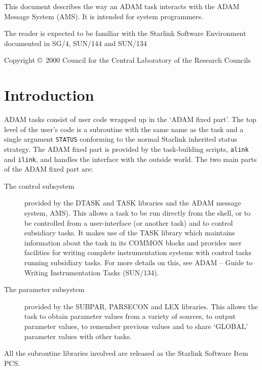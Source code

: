 \documentclass[twoside,11pt]{article}
\newcommand{\stardocinitials}  {SSN}
\newcommand{\stardoccopyright}
{Copyright \copyright\ 2000 Council for the Central Laboratory of the Research Councils}
\newcommand{\stardocnumber}    {77.0}
\newcommand{\stardocabstract}  {This document describes the way an ADAM task
interacts with the ADAM Message System
(\xref{AMS}{sun241}{}).
It is intended for system programmers.

The reader is expected to be familiar with the Starlink Software Environment
documented in
\xref{SG/4}{sg4}{},
\xref{SUN/144}{sun144}{}
and
\xref{SUN/134}{sun134}{}}
\newcommand{\stardocname}{\stardocinitials /\stardocnumber}
\newenvironment{latexonly}{}{}
\newcommand{\latex}[1]{#1}
\newcommand{\xref}[3]{#1}
\renewcommand{\_}{\texttt{\symbol{95}}}
\renewcommand{\thepage}{\roman{page}}
\begin{document}
\stardocabstract

\begin{latexonly}
\newpage
\vspace*{\fill}
\stardoccopyright
\end{latexonly}

  \newpage
  \begin{latexonly}
    \setlength{\parskip}{0mm}
    \tableofcontents
    \setlength{\parskip}{\medskipamount}
    \markboth{\stardocname}{\stardocname}
  \end{latexonly}
\cleardoublepage
\renewcommand{\thepage}{\arabic{page}}
\setcounter{page}{1}

\section{Introduction}
ADAM tasks consist of user code wrapped up in the `ADAM fixed part'.
The top level of the user's code is a subroutine with the same name as the
task and a single argument \texttt{STATUS} conforming to
\xref{the normal Starlink inherited status strategy}
{sun104}{inherited_status_checking}.
The ADAM fixed part is provided by the task-building scripts,
\xref{\texttt{alink} and \texttt{ilink}}{sun144}{adam_link_scripts},
and handles the interface with the outside world. The two main parts of the
ADAM fixed part are:
\begin{description}
\item[The control subsystem]
provided by the DTASK and TASK libraries and the ADAM message system,
\xref{AMS}{sun241}{}).
This allows a task to be run directly from the shell, or to
be controlled from a user-interface (or another task) and to control
subsidiary tasks. It makes use of the TASK library which
maintains information about the task in its COMMON blocks and provides user
facilities for writing complete instrumentation systems with control tasks
running subsidiary tasks. For more details on this, see
\xref{ADAM -- Guide to Writing Instrumentation Tasks}{sun134}{}\latex{
(SUN/134)}.
\item[The parameter subsystem] provided by the SUBPAR, PARSECON and LEX
libraries. This allows the task to obtain parameter
values from a variety of sources, to output parameter values, to remember
previous values and to share `GLOBAL' parameter values with other tasks.
 \end{description}
All the subroutine libraries involved are released as the Starlink Software
Item
\xref{PCS}{ssn29}{}.
\end{document}
